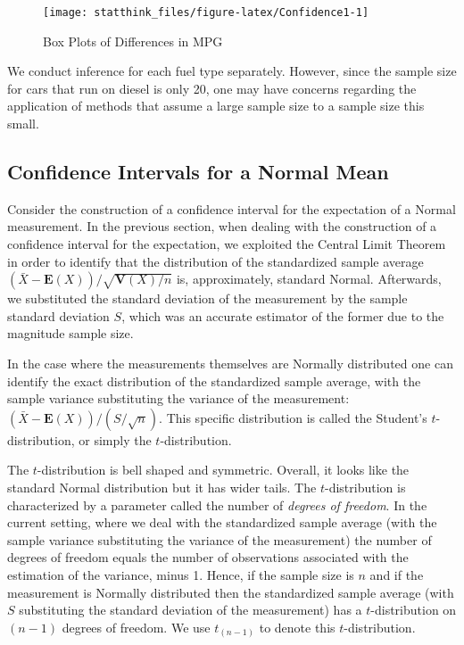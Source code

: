 \documentclass[
]{krantz}
\newcommand{\Expec}{\mathbf{E}}
\newcommand{\Var}{\mathbf{V}}
\theoremstyle{definition}
\theoremstyle{definition}
\theoremstyle{definition}
\theoremstyle{remark}
\begin{document}
\begin{figure}

{\centering \texttt{[image: statthink\_files/figure-latex/Confidence1-1]} 

}

\caption{Box Plots of Differences in MPG}\label{fig:Confidence1}
\end{figure}

We conduct inference for each fuel type separately. However, since the
sample size for cars that run on diesel is only 20, one may have
concerns regarding the application of methods that assume a large sample
size to a sample size this small.

\hypertarget{confidence-intervals-for-a-normal-mean}{%
\subsection{Confidence Intervals for a Normal Mean}\label{confidence-intervals-for-a-normal-mean}}

Consider the construction of a confidence interval for the expectation
of a Normal measurement. In the previous section, when dealing with the
construction of a confidence interval for the expectation, we exploited
the Central Limit Theorem in order to identify that the distribution of
the standardized sample average \((\bar X - \Expec(X))/\sqrt{\Var(X)/n}\)
is, approximately, standard Normal. Afterwards, we substituted the
standard deviation of the measurement by the sample standard deviation
\(S\), which was an accurate estimator of the former due to the magnitude
sample size.

In the case where the measurements themselves are Normally distributed
one can identify the exact distribution of the standardized sample
average, with the sample variance substituting the variance of the
measurement: \((\bar X - \Expec(X))/(S/\sqrt{n})\). This specific
distribution is called the Student's \(t\)-distribution, or simply the
\(t\)-distribution.

The \(t\)-distribution is bell shaped and symmetric. Overall, it looks
like the standard Normal distribution but it has wider tails. The
\(t\)-distribution is characterized by a parameter called the number of
\emph{degrees of freedom}. In the current setting, where we deal with the
standardized sample average (with the sample variance substituting the
variance of the measurement) the number of degrees of freedom equals the
number of observations associated with the estimation of the variance,
minus 1. Hence, if the sample size is \(n\) and if the measurement is
Normally distributed then the standardized sample average (with \(S\)
substituting the standard deviation of the measurement) has a
\(t\)-distribution on \((n-1)\) degrees of freedom. We use \(t_{(n-1)}\) to
denote this \(t\)-distribution.
\end{document}
